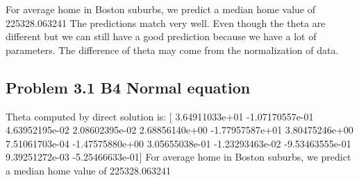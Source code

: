 \documentclass[pdftex,11pt]{article}
\begin{document}
For average home in Boston suburbs, we predict a median home value of 225328.063241
The predictions match very well. Even though the theta are different but we can still have a good prediction because we have a lot of parameters. The difference of theta may come from the normalization of data.


\subsection{Problem 3.1 B4 Normal equation}

Theta computed by direct solution is:  [  3.64911033e+01  -1.07170557e-01   4.63952195e-02   2.08602395e-02
   2.68856140e+00  -1.77957587e+01   3.80475246e+00   7.51061703e-04
  -1.47575880e+00   3.05655038e-01  -1.23293463e-02  -9.53463555e-01
   9.39251272e-03  -5.25466633e-01]
For average home in Boston suburbs, we predict a median home value of 225328.063241
\end{document}
